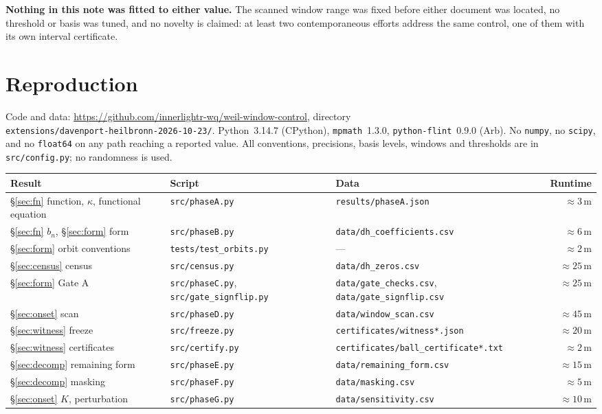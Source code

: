 \documentclass[11pt,a4paper]{article}
\theoremstyle{definition}
\theoremstyle{remark}
\newcommand{\src}[1]{{\footnotesize\texttt{#1}}}
\begin{document}
\textbf{Nothing in this note was fitted to either value.} The scanned window range was
fixed before either document was located, no threshold or basis was tuned, and no
novelty is claimed: at least two contemporaneous efforts address the same control, one of
them with its own interval certificate.

\section{Reproduction}\label{app:repro}

Code and data: \url{https://github.com/innerlightr-wq/weil-window-control}, directory\\
\src{extensions/davenport-heilbronn-2026-10-23/}. Python~3.14.7 (CPython),
\texttt{mpmath}~1.3.0, \texttt{python-flint}~0.9.0 (Arb). No \texttt{numpy}, no
\texttt{scipy}, and no \texttt{float64} on any path reaching a reported value. All
conventions, precisions, basis levels, windows and thresholds are in \src{src/config.py};
no randomness is used.

\begin{center}\footnotesize
\setlength{\tabcolsep}{4pt}
\begin{tabular}{@{}p{}p{}p{}r@{}}
\toprule
Result & Script & Data & Runtime \\
\midrule
\S\ref{sec:fn} function, $\kappa$, functional equation & \src{src/phaseA.py} & \src{results/phaseA.json} & ${\approx}3$\,m \\
\S\ref{sec:fn} $b_n$, \S\ref{sec:form} form & \src{src/phaseB.py} & \src{data/dh\_coefficients.csv} & ${\approx}6$\,m \\
\S\ref{sec:form} orbit conventions & \src{tests/test\_orbits.py} & --- & ${\approx}2$\,m \\
\S\ref{sec:census} census & \src{src/census.py} & \src{data/dh\_zeros.csv} & ${\approx}25$\,m \\
\S\ref{sec:form} Gate A & \src{src/phaseC.py}, \src{src/gate\_signflip.py} & \src{data/gate\_checks.csv}, \src{data/gate\_signflip.csv} & ${\approx}25$\,m \\
\S\ref{sec:onset} scan & \src{src/phaseD.py} & \src{data/window\_scan.csv} & ${\approx}45$\,m \\
\S\ref{sec:witness} freeze & \src{src/freeze.py} & \src{certificates/witness*.json} & ${\approx}20$\,m \\
\S\ref{sec:witness} certificates & \src{src/certify.py} & \src{certificates/ball\_certificate*.txt} & ${\approx}2$\,m \\
\S\ref{sec:decomp} remaining form & \src{src/phaseE.py} & \src{data/remaining\_form.csv} & ${\approx}15$\,m \\
\S\ref{sec:decomp} masking & \src{src/phaseF.py} & \src{data/masking.csv} & ${\approx}5$\,m \\
\S\ref{sec:onset} $K$, perturbation & \src{src/phaseG.py} & \src{data/sensitivity.csv} & ${\approx}10$\,m \\
\bottomrule
\end{tabular}
\end{center}
\end{document}
